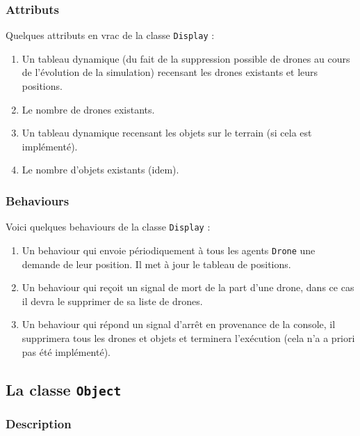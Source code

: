 \documentclass[11pt]{report}
\begin{document}
\subsubsection{Attributs}

Quelques attributs en vrac de la classe \verb|Display| :

\begin{enumerate}
\item Un tableau dynamique (du fait de la suppression possible de drones au cours de l'évolution de la simulation) recensant les drones existants et leurs positions.

\item Le nombre de drones existants.

\item Un tableau dynamique recensant les objets sur le terrain (si cela est implémenté).

\item Le nombre d'objets existants (idem).
\end{enumerate}

\subsubsection{Behaviours}

Voici quelques behaviours de la classe \verb|Display| :

\begin{enumerate}
\item Un behaviour qui envoie périodiquement à tous les agents \verb|Drone| une demande de leur position. Il met à jour le tableau de positions.

\item Un behaviour qui reçoit un signal de mort de la part d'une drone, dans ce cas il devra le supprimer de sa liste de drones.

\item Un behaviour qui répond un signal d'arrêt en provenance de la console, il supprimera tous les drones et objets et terminera l'exécution (cela n'a a priori pas été implémenté).
\end{enumerate}

\subsection{La classe \protect\Verb+Object+}
\subsubsection{Description}
\end{document}
